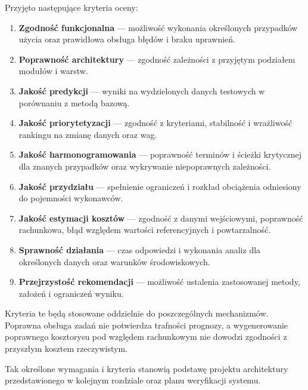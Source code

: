 Przyjęto następujące kryteria oceny:
\begin{enumerate}
    \item \textbf{Zgodność funkcjonalna} --- możliwość wykonania określonych przypadków użycia oraz prawidłowa obsługa błędów i braku uprawnień.
    \item \textbf{Poprawność architektury} --- zgodność zależności z przyjętym podziałem modułów i warstw.
    \item \textbf{Jakość predykcji} --- wyniki na wydzielonych danych testowych w porównaniu z metodą bazową.
    \item \textbf{Jakość priorytetyzacji} --- zgodność z kryteriami, stabilność i wrażliwość rankingu na zmianę danych oraz wag.
    \item \textbf{Jakość harmonogramowania} --- poprawność terminów i ścieżki krytycznej dla znanych przypadków oraz wykrywanie niepoprawnych zależności.
    \item \textbf{Jakość przydziału} --- spełnienie ograniczeń i rozkład obciążenia odniesiony do pojemności wykonawców.
    \item \textbf{Jakość estymacji kosztów} --- zgodność z danymi wejściowymi, poprawność rachunkowa, błąd względem wartości referencyjnych i powtarzalność.
    \item \textbf{Sprawność działania} --- czas odpowiedzi i wykonania analiz dla określonych danych oraz warunków środowiskowych.
    \item \textbf{Przejrzystość rekomendacji} --- możliwość ustalenia zastosowanej metody, założeń i ograniczeń wyniku.
\end{enumerate}

Kryteria te będą stosowane oddzielnie do poszczególnych mechanizmów. Poprawna obsługa zadań nie potwierdza trafności prognozy, a wygenerowanie poprawnego kosztorysu pod względem rachunkowym nie dowodzi zgodności z przyszłym kosztem rzeczywistym.

Tak określone wymagania i kryteria stanowią podstawę projektu architektury przedstawionego w kolejnym rozdziale oraz planu weryfikacji systemu.